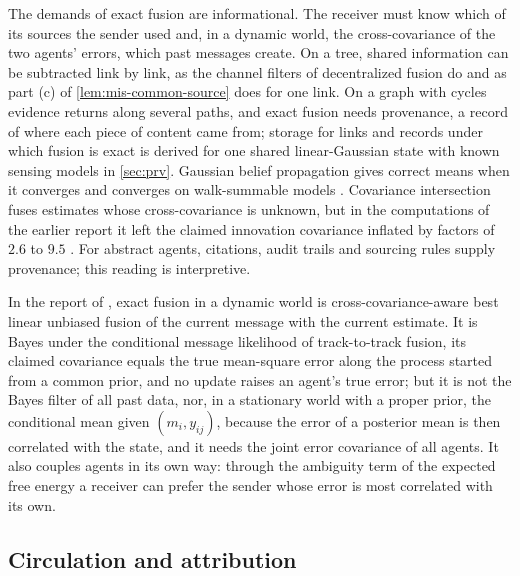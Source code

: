 The demands of exact fusion are informational. The receiver must know which of its sources the sender used and, in a dynamic world, the cross-covariance of the two agents' errors, which past messages create. On a tree, shared information can be subtracted link by link, as the channel filters of decentralized fusion do \citep{grime1994data} and as part (c) of \cref{lem:mis-common-source} does for one link. On a graph with cycles evidence returns along several paths, and exact fusion needs provenance, a record of where each piece of content came from; storage for links and records under which fusion is exact is derived for one shared linear-Gaussian state with known sensing models in \cref{sec:prv}. Gaussian belief propagation gives correct means when it converges \citep{weiss2001correctness} and converges on walk-summable models \citep{malioutov2006walk}. Covariance intersection \citep{julier1997nondivergent} fuses estimates whose cross-covariance is unknown, but in the computations of the earlier report it left the claimed innovation covariance inflated by factors of $2.6$ to $9.5$ \citep{dennis2026communicating}. For abstract agents, citations, audit trails and sourcing rules supply provenance; this reading is interpretive.

\begin{remark}\label{rem:mis-exact-fusion}
In the report of \citet{dennis2026communicating}, exact fusion in a dynamic world is cross-covariance-aware best linear unbiased fusion of the current message with the current estimate. It is Bayes under the conditional message likelihood of track-to-track fusion, its claimed covariance equals the true mean-square error along the process started from a common prior, and no update raises an agent's true error; but it is not the Bayes filter of all past data, nor, in a stationary world with a proper prior, the conditional mean given $(m_i,y_{ij})$, because the error of a posterior mean is then correlated with the state, and it needs the joint error covariance of all agents. It also couples agents in its own way: through the ambiguity term of the expected free energy a receiver can prefer the sender whose error is most correlated with its own.
\end{remark}

\subsection{Circulation and attribution}\label{sup:mis-circulation-and-attribution}

